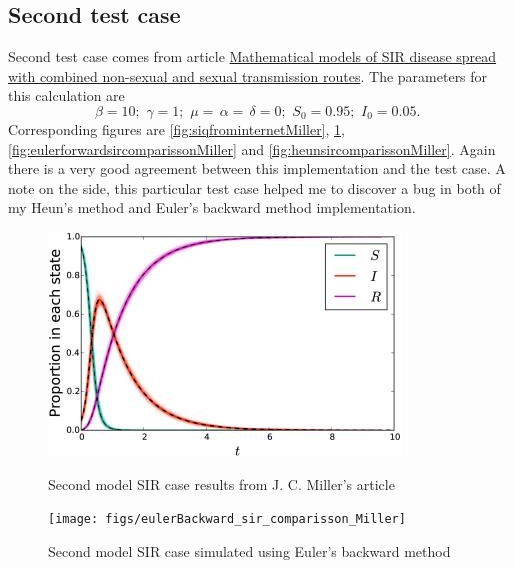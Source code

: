 \documentclass[a4paper]{article}
\begin{document}
\subsection{Second test case}
Second test case comes from article  \href{https://www.ncbi.nlm.nih.gov/pmc/articles/PMC5963332/}{Mathematical models of SIR disease spread with combined non-sexual and sexual transmission routes}. The parameters for this calculation are
\begin{equation}\label{eq:parameters2ndExample}
\beta = 10;\,\,
\gamma = 1;\,\,
\mu=\,\alpha=\,\delta = 0;\,\,
S_0 = 0.95;\,\,
I_0 = 0.05.\,\,
\end{equation}
Corresponding figures are \ref{fig:siqfrominternetMiller}, \ref{fig:eulerbackwardsircomparissonMiller}, \ref{fig:eulerforwardsircomparissonMiller} and \ref{fig:heunsircomparissonMiller}. Again there is a very good agreement between this implementation and the test case. A note on the side, this particular test case helped me to discover a bug in both of my Heun's method and Euler's backward method implementation.

\begin{figure}[h]
	\centering
	\begin{minipage}{.5\textwidth}
		\centering
		\includegraphics[width=1\linewidth]{figs/sirMiller.jpg}
		\caption[Model case2]{Second model SIR case results from J. C. Miller's article}
		\label{fig:siqfrominternetMiller}
	\end{minipage}%
	\begin{minipage}{.5\textwidth}
		\centering
		\texttt{[image: figs/eulerBackward\_sir\_comparisson\_Miller]}
		\caption[Backward SIR2]{Second model SIR case simulated using Euler's backward method}
		\label{fig:eulerbackwardsircomparissonMiller}
	\end{minipage}
\end{figure}
\end{document}
